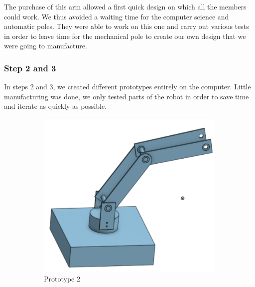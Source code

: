 The purchase of this arm allowed a first quick design on which all the members could work. We thus avoided a waiting time for the computer science and automatic poles. They were able to work on this one and carry out various tests in order to leave time for the mechanical pole to create our own design that we were going to manufacture.

\subsubsection{Step 2 and 3}

In steps 2 and 3, we created different prototypes entirely on the computer. Little manufacturing was done, we only tested parts of the robot in order to save time and iterate as quickly as possible.
\begin{figure}[H]
    \begin{subfigure}{.5\linewidth}
        \centering
        \includegraphics[scale = 0.3]{Images/Section03/prototype2.png}
        \caption{Prototype 2}
        \label{fig:Prototype2}
    \end{subfigure}%
    \begin{subfigure}{.5\linewidth}
        \centering

\end{subfigure}
\end{figure}
